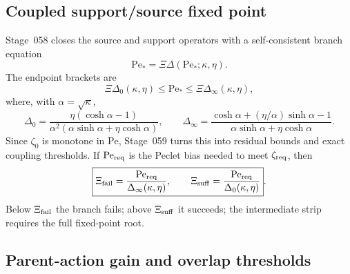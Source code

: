 \subsection{Coupled support/source fixed point}
\label{subsec:part03-support-source-fixed-point}

Stage~058 closes the source and support operators with a self-consistent branch equation
\begin{equation}
\label{eq:part03-Pe-fixed-point}
\boxed{
\mathrm{Pe}_*=\Xi\Delta(\mathrm{Pe}_*;\kappa,\eta)}.
\end{equation}
The endpoint brackets are
\begin{equation}
\label{eq:part03-Pe-bracket}
\Xi\Delta_0(\kappa,\eta)
\leq\mathrm{Pe}_*
\leq
\Xi\Delta_\infty(\kappa,\eta),
\end{equation}
where, with \(\alpha=\sqrt\kappa\),
\begin{equation}
\label{eq:part03-Delta0-Deltainf}
\Delta_0
=\frac{\eta(\cosh\alpha-1)}{\alpha^2(\alpha\sinh\alpha+\eta\cosh\alpha)},
\qquad
\Delta_\infty
=\frac{\cosh\alpha+(\eta/\alpha)\sinh\alpha-1}
{\alpha\sinh\alpha+\eta\cosh\alpha}.
\end{equation}
Since \(\zeta_0\) is monotone in \(\mathrm{Pe}\), Stage~059 turns this into residual bounds and exact coupling thresholds.  If \(\mathrm{Pe}_{\rm req}\) is the Peclet bias needed to meet \(\zeta_{\rm req}\), then
\begin{equation}
\label{eq:part03-Xi-thresholds}
\boxed{
\Xi_{\rm fail}=\frac{\mathrm{Pe}_{\rm req}}{\Delta_\infty(\kappa,
\eta)},
\qquad
\Xi_{\rm suff}=\frac{\mathrm{Pe}_{\rm req}}{\Delta_0(\kappa,
\eta)}}.
\end{equation}
Below \(\Xi_{\rm fail}\) the branch fails; above \(\Xi_{\rm suff}\) it succeeds; the intermediate strip requires the full fixed-point root.

\subsection{Parent-action gain and overlap thresholds}
\label{subsec:part03-parent-gain}

